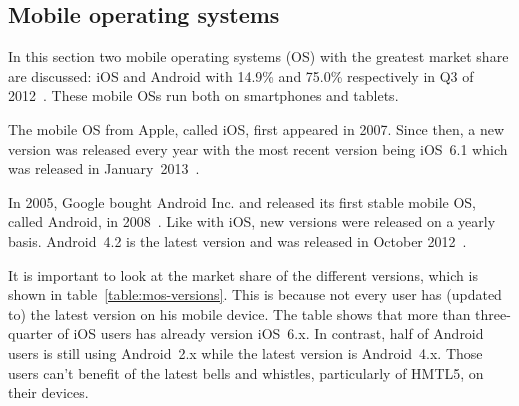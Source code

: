 \documentclass[a4paper]{artikel3}
\begin{document}
\subsection{Mobile operating systems}
In this section two mobile operating systems (OS) with the greatest market share are discussed: iOS and Android with 14.9\% and 75.0\% respectively in Q3 of 2012~\cite{Protalinski2012}.
These mobile OSs run both on smartphones and tablets.

The mobile OS from Apple, called iOS, first appeared in 2007.
Since then, a new version was released every year with the most recent version being iOS~6.1 which was released in January~2013~\cite{Deitel2012,PhilDutson2012,Apple2013}.

In 2005, Google bought Android Inc. and released its first stable mobile OS, called Android, in 2008~\cite{Satyesh2012}.
Like with iOS, new versions were released on a yearly basis.
Android~4.2 is the latest version and was released in October 2012~\cite{Sawers2012}.

It is important to look at the market share of the different versions, which is shown in table~\ref{table:mos-versions}.
This is because not every user has (updated to) the latest version on his mobile device.
The table shows that more than three-quarter of iOS users has already version iOS~6.x.
In contrast, half of Android users is still using Android~2.x while the latest version is Android~4.x. 
Those users can't benefit of the latest bells and whistles, particularly of HMTL5, on their devices.

\begin{table}[t]
\centering
{}
\quad
{}
\caption{Market share of iOS versions on February 14, 2013 and Android versions on April 2, 2013 \protect\cite{Sylvain2013,Android2013}.}
\label{table:mos-versions}
\end{table}
\end{document}
